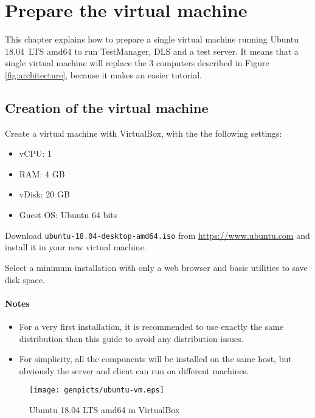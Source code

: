 \chapter{Prepare the virtual machine}


This chapter explains how to prepare a single virtual machine running
Ubuntu 18.04~LTS amd64 to run TestManager, DLS and a test server.
It means that a single virtual machine will replace the 3 computers
described in Figure \ref{fig:architecture}, because it makes an easier
tutorial.


\section{Creation of the virtual machine}

Create a virtual machine with VirtualBox, with the the following settings:
\begin{itemize}
\item vCPU: 1
\item RAM: 4 GB
\item vDisk: 20 GB
\item Guest OS: Ubuntu 64 bits
\end{itemize}


Download \texttt{ubuntu-18.04-desktop-amd64.iso} from
\url{https://www.ubuntu.com}
and install it in your new virtual machine.

Select a minimum installation with only a web browser and basic utilities
to save disk space.


\subsubsection{Notes}

\begin{itemize}
\item For a very first installation, it is recommended to use exactly the same
  distribution than this guide to avoid any distribution issues.
\item For simplicity, all the components will be installed on the same host,
  but obviously the server and client can run on different machines.
\end{itemize}


\begin{figure}[h!]
  \texttt{[image: genpicts/ubuntu-vm.eps]}
  \caption{Ubuntu 18.04 LTS amd64 in VirtualBox}
  \label{fig:ubuntu-vm}
\end{figure}

